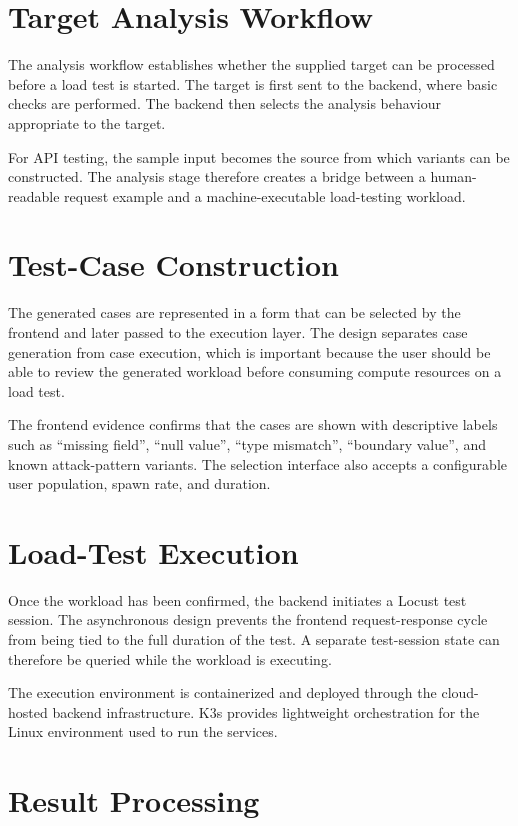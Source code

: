 \documentclass{tietreport}
\begin{document}
\section{Target Analysis Workflow}

The analysis workflow establishes whether the supplied target can be processed before a load test is started. The target is first sent to the backend, where basic checks are performed. The backend then selects the analysis behaviour appropriate to the target.

For API testing, the sample input becomes the source from which variants can be constructed. The analysis stage therefore creates a bridge between a human-readable request example and a machine-executable load-testing workload.

\section{Test-Case Construction}

The generated cases are represented in a form that can be selected by the frontend and later passed to the execution layer. The design separates case generation from case execution, which is important because the user should be able to review the generated workload before consuming compute resources on a load test.

The frontend evidence confirms that the cases are shown with descriptive labels such as ``missing field'', ``null value'', ``type mismatch'', ``boundary value'', and known attack-pattern variants. The selection interface also accepts a configurable user population, spawn rate, and duration.

\section{Load-Test Execution}

Once the workload has been confirmed, the backend initiates a Locust test session. The asynchronous design prevents the frontend request-response cycle from being tied to the full duration of the test. A separate test-session state can therefore be queried while the workload is executing.

The execution environment is containerized and deployed through the cloud-hosted backend infrastructure. K3s provides lightweight orchestration for the Linux environment used to run the services.

\section{Result Processing}
\end{document}
